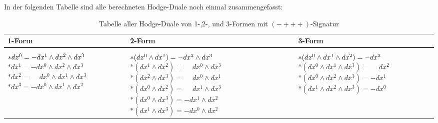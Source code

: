In der folgenden Tabelle sind alle berechneten Hodge-Duale noch einmal zusammengefasst:
\begin{table}[htbp]
	\centering
	\begin{tabularx}{\textwidth}{ 
			| >{\centering\arraybackslash}X 
			| >{\centering\arraybackslash}X 
			| >{\centering\arraybackslash}X | }
		\hline
		\textbf{1-Form} & \textbf{2-Form} & \textbf{3-Form} \\
		\hline
		\( \rule{0pt}{1.5em} {\ast} dx^0 = -dx^1 \wedge dx^2 \wedge dx^3 \) \newline
	\( {\ast} dx^1 = -dx^0 \wedge dx^2 \wedge dx^3 \) \newline
	\( {\ast} dx^2 = \phantom{-} dx^0 \wedge dx^1 \wedge dx^3 \) \newline
	\( {\ast} dx^3 = -dx^0 \wedge dx^1 \wedge dx^2 \, \) 
	&
	\( \rule{0pt}{1.5em} {\ast} (dx^0 \wedge dx^1) = -dx^2 \wedge dx^3 \) \newline
	\( {\ast} (dx^1 \wedge dx^2) = \phantom{-} dx^0 \wedge dx^3 \) \newline
	\( {\ast} (dx^2 \wedge dx^3) = \phantom{-} dx^0 \wedge dx^1 \) \newline
	\( {\ast} (dx^0 \wedge dx^2) = \phantom{-} dx^1 \wedge dx^3 \) \newline
	\( {\ast} (dx^0 \wedge dx^3) = -dx^1 \wedge dx^2 \) \newline
	\( {\ast} (dx^1 \wedge dx^3) = -dx^0 \wedge dx^2 \)
	&
	\( \rule{0pt}{1.5em} {\ast} (dx^0 \wedge dx^1 \wedge dx^2) = -dx^3 \) \newline
	\( {\ast} (dx^0 \wedge dx^1 \wedge dx^3) = \phantom{-} dx^2 \) \newline
	\( {\ast} (dx^0 \wedge dx^2 \wedge dx^3) = -dx^1 \) \newline
	\( {\ast} (dx^1 \wedge dx^2 \wedge dx^3) = -dx^0 \)
		\\
		\hline
	\end{tabularx}
	\caption{Tabelle aller Hodge-Duale von 1-,2-, und 3-Formen mit $({-}{+}{+}{+})$-Signatur}
	\label{maxwell:section:teil1:Hodge-Tabelle}
\end{table}







